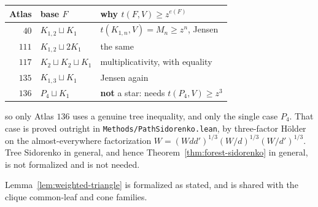 \documentclass[11pt]{article}
\begin{document}
\begin{center}
\begin{tabular}{r|l|l}
Atlas & base $F$ & why $t(F,V)\geq z^{e(F)}$\\\hline
$40$ & $K_{1,2}\sqcup K_1$ & $t(K_{1,n},V)=M_n\geq z^n$, Jensen\\
$111$ & $K_{1,2}\sqcup2K_1$ & the same\\
$117$ & $K_2\sqcup K_2\sqcup K_1$ & multiplicativity, with equality\\
$135$ & $K_{1,3}\sqcup K_1$ & Jensen again\\
$136$ & $P_4\sqcup K_1$ & \textbf{not} a star: needs $t(P_4,V)\geq z^3$
\end{tabular}
\end{center}

so only Atlas $136$ uses a genuine tree inequality, and only the single case
$P_4$.  That case is proved outright in \texttt{Methods/PathSidorenko.lean}, by
three-factor H\"older on the almost-everywhere factorization
$W=(Wdd')^{1/3}(W/d)^{1/3}(W/d')^{1/3}$.  Tree Sidorenko in general, and hence
Theorem~\ref{thm:forest-sidorenko} in general, is not formalized and is not
needed.

Lemma~\ref{lem:weighted-triangle} is formalized as stated, and is shared with
the clique common-leaf and cone families.
\end{document}
